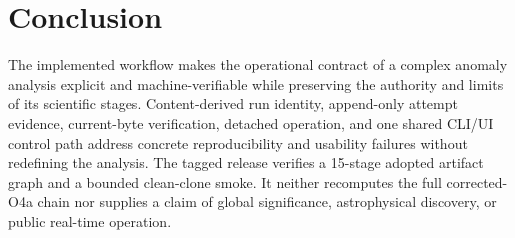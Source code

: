 \documentclass[aps,prd,twocolumn,superscriptaddress,nofootinbib,amsmath,amssymb,floatfix,10pt]{revtex4-2}
\begin{document}
\section{Conclusion}
\label{sec:conclusion}

The implemented workflow makes the operational contract of a complex anomaly
analysis explicit and machine-verifiable while preserving the authority and
limits of its scientific stages.  Content-derived run identity, append-only
attempt evidence, current-byte verification, detached operation, and one
shared CLI/UI control path address concrete reproducibility and usability
failures without redefining the analysis.  The tagged release verifies a
15-stage adopted artifact graph and a bounded clean-clone smoke.  It neither
recomputes the full corrected-O4a chain nor supplies a claim of global
significance, astrophysical discovery, or public real-time operation.



\end{document}
